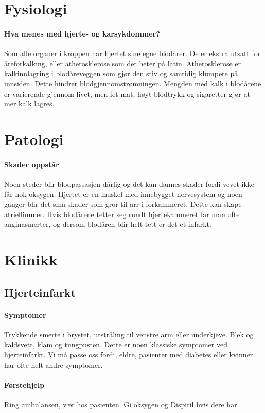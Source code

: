 \documentclass[12pt]{memoir} %
\begin{document}
		\section{Fysiologi}	
			\paragraph{Hva menes med hjerte- og karsykdommer?\\}
				Som alle organer i kroppen har hjertet sine egne blodårer. De er ekstra utsatt for åreforkalking, eller atherosklerose som det heter på latin. Atherosklerose er kalkinnlagring i blodåreveggen som gjør den stiv og samtidig klumpete på innsiden. Dette hindrer blodgjennomstrømningen. Mengden med kalk i blodårene er varierende gjennom livet, men fet mat, høyt blodtrykk og sigaretter gjør at mer kalk lagres. 
		\section{Patologi}	
			\paragraph{Skader oppstår\\}
				Noen steder blir blodpassasjen dårlig og det kan dannes skader fordi vevet ikke får nok oksygen. Hjertet er en muskel med innebygget nervesystem og noen ganger blir det små skader som gror til arr i forkammeret. Dette kan skape atrieflimmer\cite{!!!}. Hvis blodårene tetter seg rundt hjertekammeret får man ofte anginasmerter, og dersom blodåren blir helt tett er det et infarkt.
		\section{Klinikk}
			\subsection{Hjerteinfarkt}	
				\paragraph{Symptomer\\}
					Trykkende smerte i brystet, utstråling til venstre arm eller underkjeve. Blek og kaldsvett, klam og tungpusten. Dette er noen klassiske symptomer ved hjerteinfarkt. Vi må passe oss fordi, eldre, pasienter med diabetes eller kvinner har ofte helt andre symptomer. 
				\paragraph{Førstehjelp\\}
					Ring ambulansen, vær hos pasienten. Gi oksygen og Dispiril hvis dere har. 
\end{document}
